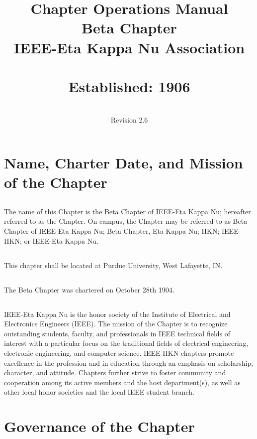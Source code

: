 \documentclass[10pt, oneside]{article}
\title{Chapter Operations Manual \\ Beta Chapter \\ IEEE-Eta Kappa Nu Association \\~\\ Established: 1906}
\author{\\Revision 2.6}
\date{}
\renewcommand{\thesection}{ARTICLE \Roman{section}}
\begin{document}
\pagestyle{fancy}
\fancyhead[R]{}
\renewcommand{\sectionmark}[1]{\markright{\MakeUppercase{\thesection. \ #1}}{}}
\renewcommand{\subsectionmark}[1]{}


\maketitle
\thispagestyle{empty}
\clearpage
\setcounter{page}{1}

\tableofcontents
\clearpage

\section{Name, Charter Date, and Mission of the Chapter}
\subsection{}
The name of this Chapter is the Beta Chapter of IEEE-Eta Kappa Nu; hereafter referred to as the Chapter. On campus, the Chapter may be referred to as Beta Chapter of IEEE-Eta Kappa Nu; Beta Chapter, Eta Kappa Nu; HKN; IEEE-HKN; or IEEE-Eta Kappa Nu.
\subsection{}
This chapter shall be located at Purdue University, West Lafayette, IN.
\subsection{}
The Beta Chapter was chartered on October 28th 1904.
\subsection{}
IEEE-Eta Kappa Nu is the honor society of the Institute of Electrical and Electronics Engineers (IEEE). The mission of the Chapter is to recognize outstanding students, faculty, and professionals in IEEE technical fields of interest with a particular focus on the traditional fields of electrical engineering, electronic engineering, and computer science. IEEE-HKN chapters promote excellence in the profession and in education through an emphasis on scholarship, character, and attitude. Chapters further strive to foster community and cooperation among its active members and the host department(s), as well as other local honor societies and the local IEEE student branch.

\section{Governance of the Chapter}
\end{document}
